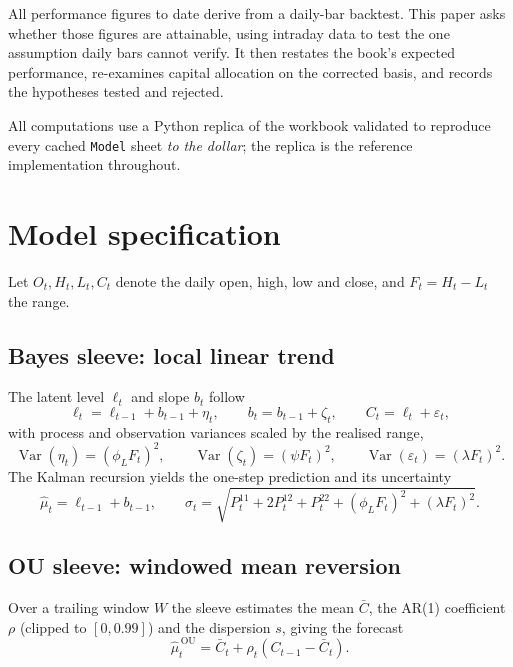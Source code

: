 \documentclass[11pt]{article}
\begin{document}
All performance figures to date derive from a daily-bar backtest. This paper asks whether those
figures are attainable, using intraday data to test the one assumption daily bars cannot
verify. It then restates the book's expected performance, re-examines capital allocation on the
corrected basis, and records the hypotheses tested and rejected.

All computations use a Python replica of the workbook validated to reproduce every cached
\texttt{Model} sheet \emph{to the dollar}; the replica is the reference implementation
throughout.

\section{Model specification}

Let $O_t,H_t,L_t,C_t$ denote the daily open, high, low and close, and $F_t=H_t-L_t$ the range.

\subsection{Bayes sleeve: local linear trend}

The latent level $\ell_t$ and slope $b_t$ follow
\begin{equation}
\ell_t = \ell_{t-1} + b_{t-1} + \eta_t, \qquad
b_t = b_{t-1} + \zeta_t, \qquad
C_t = \ell_t + \varepsilon_t,
\end{equation}
with process and observation variances scaled by the realised range,
\begin{equation}
\operatorname{Var}(\eta_t)=(\phi_L F_t)^2,\qquad
\operatorname{Var}(\zeta_t)=(\psi F_t)^2,\qquad
\operatorname{Var}(\varepsilon_t)=(\lambda F_t)^2 .
\end{equation}
The Kalman recursion yields the one-step prediction and its uncertainty
\begin{equation}
\hat{\mu}_t = \ell_{t-1}+b_{t-1}, \qquad
\sigma_t = \sqrt{P^{11}_t+2P^{12}_t+P^{22}_t+(\phi_L F_t)^2+(\lambda F_t)^2}.
\end{equation}

\subsection{OU sleeve: windowed mean reversion}

Over a trailing window $W$ the sleeve estimates the mean $\bar{C}$, the AR(1) coefficient
$\rho$ (clipped to $[0,0.99]$) and the dispersion $s$, giving the forecast
\begin{equation}
\hat{\mu}^{\,\mathrm{OU}}_t = \bar{C}_t + \rho_t\left(C_{t-1}-\bar{C}_t\right).
\end{equation}
\end{document}
